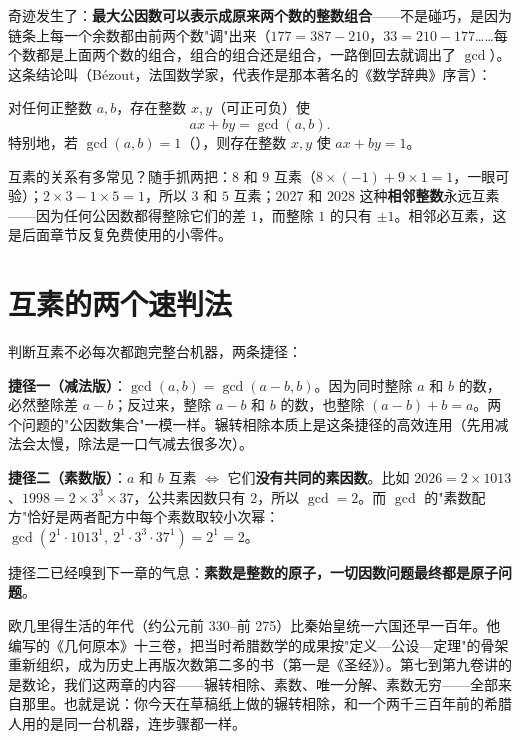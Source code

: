 奇迹发生了：\textbf{最大公因数可以表示成原来两个数的整数组合}——不是碰巧，是因为链条上每一个余数都由前两个数"调"出来（$177 = 387 - 210$，$33 = 210 - 177$……每个数都是上面两个数的组合，组合的组合还是组合，一路倒回去就调出了 $\gcd$）。这条结论叫（Bézout，法国数学家，代表作是那本著名的《数学辞典》序言）：

\begin{dingli}[裴蜀等式]
对任何正整数 $a, b$，存在整数 $x, y$（可正可负）使
\[
ax + by = \gcd(a, b).
\]
特别地，若 $\gcd(a,b) = 1$（），则存在整数 $x,y$ 使 $ax + by = 1$。
\end{dingli}

互素的关系有多常见？随手抓两把：$8$ 和 $9$ 互素（$8\times(-1) + 9\times 1 = 1$，一眼可验）；$2\times 3 - 1\times 5 = 1$，所以 $3$ 和 $5$ 互素；$2027$ 和 $2028$ 这种\textbf{相邻整数}永远互素——因为任何公因数都得整除它们的差 $1$，而整除 $1$ 的只有 $\pm 1$。相邻必互素，这是后面章节反复免费使用的小零件。

\section{互素的两个速判法}

判断互素不必每次都跑完整台机器，两条捷径：

\textbf{捷径一（减法版）}：$\gcd(a, b) = \gcd(a - b, b)$。因为同时整除 $a$ 和 $b$ 的数，必然整除差 $a - b$；反过来，整除 $a-b$ 和 $b$ 的数，也整除 $(a-b)+b = a$。两个问题的"公因数集合"一模一样。辗转相除本质上是这条捷径的高效连用（先用减法会太慢，除法是一口气减去很多次）。

\textbf{捷径二（素数版）}：$a$ 和 $b$ 互素 $\iff$ 它们\textbf{没有共同的素因数}。比如 $2026 = 2\times 1013$、$1998 = 2\times 3^3\times 37$，公共素因数只有 $2$，所以 $\gcd = 2$。而 $\gcd$ 的"素数配方"恰好是两者配方中每个素数取较小次幂：$\gcd(2^1\cdot 1013^1,\ 2^1\cdot 3^3\cdot 37^1) = 2^1 = 2$。

捷径二已经嗅到下一章的气息：\textbf{素数是整数的原子，一切因数问题最终都是原子问题}。

\begin{lishi}
欧几里得生活的年代（约公元前 330--前 275）比秦始皇统一六国还早一百年。他编写的《几何原本》十三卷，把当时希腊数学的成果按"定义—公设—定理"的骨架重新组织，成为历史上再版次数第二多的书（第一是《圣经》）。第七到第九卷讲的是数论，我们这两章的内容——辗转相除、素数、唯一分解、素数无穷——全部来自那里。也就是说：你今天在草稿纸上做的辗转相除，和一个两千三百年前的希腊人用的是同一台机器，连步骤都一样。
\end{lishi}

